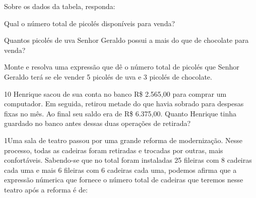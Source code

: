
Sobre os dados da tabela, responda:

\begin{escolha}
\item
  Qual o número total de picolés disponíveis para venda?

\bigskip

\item
Quantos picolés de uva Senhor Geraldo possui a mais do que de chocolate
para venda?

\bigskip

\item
Monte e resolva uma expressão que dê o número total de picolés que Senhor
Geraldo terá se ele vender 5 picolés de uva e 3 picolés de chocolate.

\end{escolha}

\num{10} Henrique sacou de sua conta no banco R\$ 2.565,00 para comprar
um computador. Em seguida, retirou metade do que havia sobrado para
despesas fixas no mês. Ao final seu saldo era de R\$ 6.375,00. Quanto
Henrique tinha guardado no banco antes dessas duas operações de retirada?


\pagebreak
{}

\num{1}Uma sala de teatro passou por uma grande reforma de modernização.
Nesse processo, todas as cadeiras foram retiradas e trocadas por outras,
mais confortáveis. Sabendo-se que no total foram instaladas 25 fileiras
com 8 cadeiras cada uma e mais 6 fileiras com 6 cadeiras cada uma,
podemos afirma que a expressão númerica que fornece o número total de
cadeiras que teremos nesse teatro após a reforma é de:

